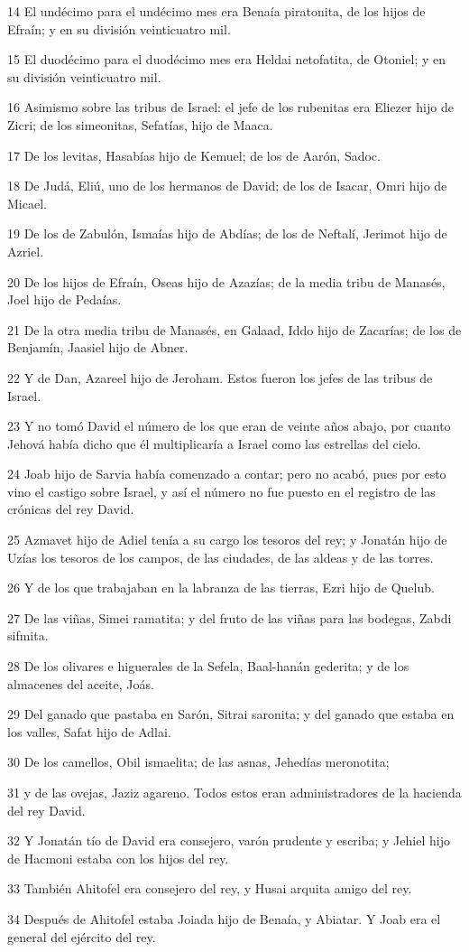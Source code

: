 \par 14 El undécimo para el undécimo mes era Benaía piratonita, de los hijos de Efraín; y en su división veinticuatro mil.
\par 15 El duodécimo para el duodécimo mes era Heldai netofatita, de Otoniel; y en su división veinticuatro mil.
\par 16 Asimismo sobre las tribus de Israel: el jefe de los rubenitas era Eliezer hijo de Zicri; de los simeonitas, Sefatías, hijo de Maaca.
\par 17 De los levitas, Hasabías hijo de Kemuel; de los de Aarón, Sadoc.
\par 18 De Judá, Eliú, uno de los hermanos de David; de los de Isacar, Omri hijo de Micael.
\par 19 De los de Zabulón, Ismaías hijo de Abdías; de los de Neftalí, Jerimot hijo de Azriel.
\par 20 De los hijos de Efraín, Oseas hijo de Azazías; de la media tribu de Manasés, Joel hijo de Pedaías.
\par 21 De la otra media tribu de Manasés, en Galaad, Iddo hijo de Zacarías; de los de Benjamín, Jaasiel hijo de Abner.
\par 22 Y de Dan, Azareel hijo de Jeroham. Estos fueron los jefes de las tribus de Israel.
\par 23 Y no tomó David el número de los que eran de veinte años abajo, por cuanto Jehová había dicho que él multiplicaría a Israel como las estrellas del cielo. 
\par 24 Joab hijo de Sarvia había comenzado a contar; pero no acabó, pues por esto vino el castigo sobre Israel, y así el número no fue puesto en el registro de las crónicas del rey David.
\par 25 Azmavet hijo de Adiel tenía a su cargo los tesoros del rey; y Jonatán hijo de Uzías los tesoros de los campos, de las ciudades, de las aldeas y de las torres.
\par 26 Y de los que trabajaban en la labranza de las tierras, Ezri hijo de Quelub.
\par 27 De las viñas, Simei ramatita; y del fruto de las viñas para las bodegas, Zabdi sifmita.
\par 28 De los olivares e higuerales de la Sefela, Baal-hanán gederita; y de los almacenes del aceite, Joás.
\par 29 Del ganado que pastaba en Sarón, Sitrai saronita; y del ganado que estaba en los valles, Safat hijo de Adlai.
\par 30 De los camellos, Obil ismaelita; de las asnas, Jehedías meronotita;
\par 31 y de las ovejas, Jaziz agareno. Todos estos eran administradores de la hacienda del rey David.
\par 32 Y Jonatán tío de David era consejero, varón prudente y escriba; y Jehiel hijo de Hacmoni estaba con los hijos del rey.
\par 33 También Ahitofel era consejero del rey, y Husai arquita amigo del rey.
\par 34 Después de Ahitofel estaba Joiada hijo de Benaía, y Abiatar. Y Joab era el general del ejército del rey.

